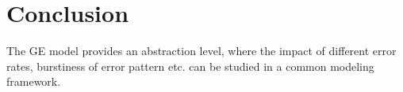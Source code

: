 \chapter{Conclusion}

The GE model provides an abstraction level, where the impact of different error
rates, burstiness of error pattern etc. can be studied in a common modeling
framework.
